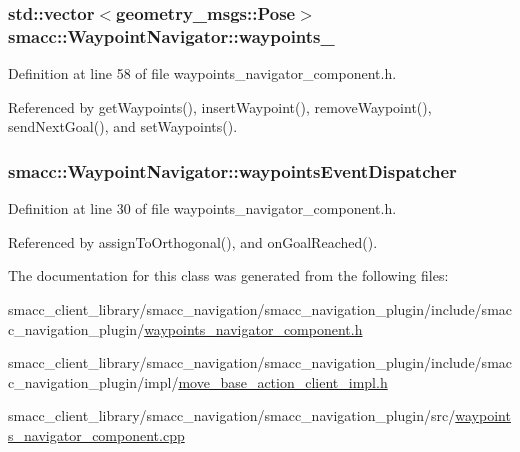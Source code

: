 \subsubsection[{\texorpdfstring{waypoints\+\_\+}{waypoints_}}]{\setlength{\rightskip}{0pt plus 5cm}std\+::vector$<$geometry\+\_\+msgs\+::\+Pose$>$ smacc\+::\+Waypoint\+Navigator\+::waypoints\+\_\+\hspace{0.3cm}{\ttfamily [private]}}\hypertarget{classsmacc_1_1WaypointNavigator_a59d691f2177430c407b8e27df07552e9}{}\label{classsmacc_1_1WaypointNavigator_a59d691f2177430c407b8e27df07552e9}


Definition at line 58 of file waypoints\+\_\+navigator\+\_\+component.\+h.



Referenced by get\+Waypoints(), insert\+Waypoint(), remove\+Waypoint(), send\+Next\+Goal(), and set\+Waypoints().

\subsubsection[{\texorpdfstring{waypoints\+Event\+Dispatcher}{waypointsEventDispatcher}}]{ smacc\+::\+Waypoint\+Navigator\+::waypoints\+Event\+Dispatcher}\hypertarget{classsmacc_1_1WaypointNavigator_aab7ff616b0eba7a5ad5f03113f2de8fd}{}\label{classsmacc_1_1WaypointNavigator_aab7ff616b0eba7a5ad5f03113f2de8fd}


Definition at line 30 of file waypoints\+\_\+navigator\+\_\+component.\+h.



Referenced by assign\+To\+Orthogonal(), and on\+Goal\+Reached().



The documentation for this class was generated from the following files\+:\begin{DoxyCompactItemize}
\item 
smacc\+\_\+client\+\_\+library/smacc\+\_\+navigation/smacc\+\_\+navigation\+\_\+plugin/include/smacc\+\_\+navigation\+\_\+plugin/\hyperlink{waypoints__navigator__component_8h}{waypoints\+\_\+navigator\+\_\+component.\+h}\item 
smacc\+\_\+client\+\_\+library/smacc\+\_\+navigation/smacc\+\_\+navigation\+\_\+plugin/include/smacc\+\_\+navigation\+\_\+plugin/impl/\hyperlink{move__base__action__client__impl_8h}{move\+\_\+base\+\_\+action\+\_\+client\+\_\+impl.\+h}\item 
smacc\+\_\+client\+\_\+library/smacc\+\_\+navigation/smacc\+\_\+navigation\+\_\+plugin/src/\hyperlink{waypoints__navigator__component_8cpp}{waypoints\+\_\+navigator\+\_\+component.\+cpp}\end{DoxyCompactItemize}
